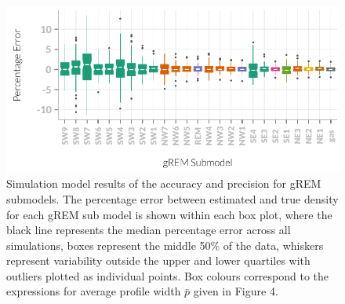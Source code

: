 \begin{knitrout}\footnotesize
{}\color{fgcolor}\begin{figure}[t]

{\centering \includegraphics[width=\textwidth]{figure/gremSubmods-1} 

}

\caption[Simulation model results of the accuracy and precision for gREM submodels]{
Simulation model results of the accuracy and precision for gREM submodels.
The percentage error between estimated and true density for each gREM sub model is shown within each box plot, where the black line represents the median percentage error across all simulations, boxes represent the middle 50\% of the data, whiskers represent variability outside the upper and lower quartiles with outliers plotted as individual points.
Box colours correspond to the expressions for average profile width $\bar{p}$ given in Figure 4. 
}\label{fig:gremSubmods}
\end{figure}


\end{knitrout}


